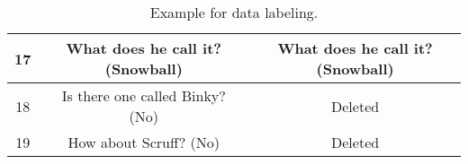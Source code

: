 \documentclass[11pt,a4paper]{article}
\begin{document}
\begin{table*}[t!]
\begin{tabular}{|c|c|c|}
		17                                                                                                                                                                                                                                          & What does he call it? (Snowball)                                                                                                                                                                                                                                                                                                                  & What does he call it? (Snowball)                                                                                                                                                                                                                                                                                                              \\ \hline
		18                                                                                                                                                                                                                                          & Is there one called Binky? (No)                                                                                                                                                                                                                                                                                                                   & Deleted                                                                                                                                                                                                                                                                                                                                       \\ \hline
		19                                                                                                                                                                                                                                          & How about Scruff? (No)                                                                                                                                                                                                                                                                                                                            & Deleted                                                                                                                                                                                                                                                                                                                                       \\ \hline
	\end{tabular}
	\caption{Example for data labeling.}
	\label{Tab:Label}
\end{table*}
\end{document}
